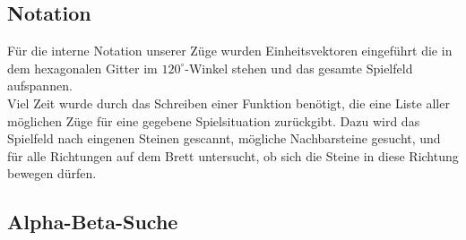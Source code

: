 \subsection{Notation}
Für die interne Notation unserer Züge wurden Einheitsvektoren eingeführt die in dem hexagonalen 
Gitter im $120^{\circ}$-Winkel stehen und das gesamte Spielfeld aufspannen.\\
Viel Zeit wurde durch das Schreiben einer Funktion benötigt, die eine Liste aller möglichen
Züge für eine gegebene Spielsituation zurückgibt. Dazu wird das Spielfeld nach eingenen
Steinen gescannt, mögliche Nachbarsteine gesucht, und für alle Richtungen auf dem Brett
untersucht, ob sich die Steine in diese Richtung bewegen dürfen.
\subsection{Alpha-Beta-Suche}
